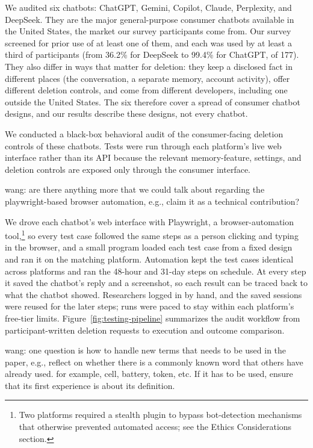 \documentclass[conference,compsoc]{IEEEtran}
\newcommand{\xw}[1] {{\color{red}wang: #1}}
\begin{document}
We audited six chatbots: ChatGPT, Gemini, Copilot, Claude, Perplexity, and DeepSeek. They are the major general-purpose consumer chatbots available in the United States, the market our survey participants come from. Our survey screened for prior use of at least one of them, and each was used by at least a third of participants (from 36.2\% for DeepSeek to 99.4\% for ChatGPT, of 177). They also differ in ways that matter for deletion: they keep a disclosed fact in different places (the conversation, a separate memory, account activity), offer different deletion controls, and come from different developers, including one outside the United States. The six therefore cover a spread of consumer chatbot designs, and our results describe these designs, not every chatbot.

We conducted a black-box behavioral audit of the consumer-facing deletion controls of these chatbots. Tests were run through each platform's live web interface rather than its API because the relevant memory-feature, settings, and deletion controls are exposed only through the consumer interface.

\xw{are there anything more that we could talk about regarding the playwright-based browser automation, e.g., claim it as a technical contribution?}

We drove each chatbot's web interface with Playwright, a browser-automation tool,\footnote{Two platforms required a stealth plugin to bypass bot-detection mechanisms that otherwise prevented automated access; see the Ethics Considerations section.} so every test case followed the same steps as a person clicking and typing in the browser, and a small program loaded each test case from a fixed design and ran it on the matching platform. Automation kept the test cases identical across platforms and ran the 48-hour and 31-day steps on schedule. At every step it saved the chatbot's reply and a screenshot, so each result can be traced back to what the chatbot showed. Researchers logged in by hand, and the saved sessions were reused for the later steps; runs were paced to stay within each platform's free-tier limits. Figure~\ref{fig:testing-pipeline} summarizes the audit workflow from participant-written deletion requests to execution and outcome comparison.

\xw{one question is how to handle new terms that needs to be used in the paper, e.g., reflect on whether there is a commonly known word that others have already used. for example, cell, battery, token, etc. If it has to be used, ensure that its first experience is about its definition.}
\end{document}
